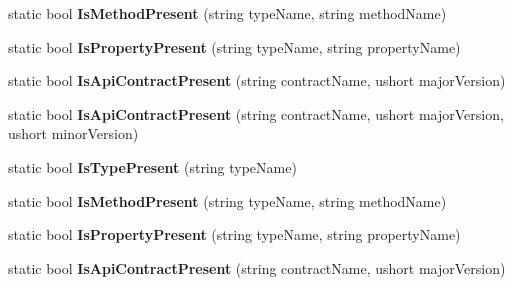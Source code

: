 \begin{DoxyCompactItemize}
static bool {\bfseries Is\+Method\+Present} (string type\+Name, string method\+Name)
\item 
\mbox{\label{class_windows_1_1_foundation_1_1_metadata_1_1_api_information_aa0236a143b0a7957254d0f59f21fef88}} 
static bool {\bfseries Is\+Property\+Present} (string type\+Name, string property\+Name)
\item 
\mbox{\label{class_windows_1_1_foundation_1_1_metadata_1_1_api_information_a673f6136fdd5584f69c299b8c5495aa5}} 
static bool {\bfseries Is\+Api\+Contract\+Present} (string contract\+Name, ushort major\+Version)
\item 
\mbox{\label{class_windows_1_1_foundation_1_1_metadata_1_1_api_information_ad08ace5ceb179078666548e256829344}} 
static bool {\bfseries Is\+Api\+Contract\+Present} (string contract\+Name, ushort major\+Version, ushort minor\+Version)
\item 
\mbox{\label{class_windows_1_1_foundation_1_1_metadata_1_1_api_information_a7347d63bdbf96f8c7d2b5e7e632abf49}} 
static bool {\bfseries Is\+Type\+Present} (string type\+Name)
\item 
\mbox{\label{class_windows_1_1_foundation_1_1_metadata_1_1_api_information_a635934986da247463159c438b6e461e2}} 
static bool {\bfseries Is\+Method\+Present} (string type\+Name, string method\+Name)
\item 
\mbox{\label{class_windows_1_1_foundation_1_1_metadata_1_1_api_information_aa0236a143b0a7957254d0f59f21fef88}} 
static bool {\bfseries Is\+Property\+Present} (string type\+Name, string property\+Name)
\item 
\mbox{\label{class_windows_1_1_foundation_1_1_metadata_1_1_api_information_a673f6136fdd5584f69c299b8c5495aa5}} 
static bool {\bfseries Is\+Api\+Contract\+Present} (string contract\+Name, ushort major\+Version)

\end{DoxyCompactItemize}
